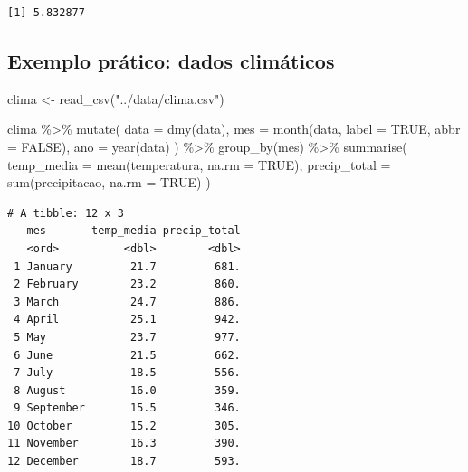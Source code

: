 \documentclass[
  letterpaper,
]{scrbook}
\newenvironment{Shaded}{\begin{snugshade}}{\end{snugshade}}
\newcommand{\AttributeTok}[1]{\textcolor[rgb]{0.40,0.45,0.13}{#1}}
\newcommand{\ConstantTok}[1]{\textcolor[rgb]{0.56,0.35,0.01}{#1}}
\newcommand{\FunctionTok}[1]{\textcolor[rgb]{0.28,0.35,0.67}{#1}}
\newcommand{\NormalTok}[1]{\textcolor[rgb]{0.00,0.23,0.31}{#1}}
\newcommand{\OtherTok}[1]{\textcolor[rgb]{0.00,0.23,0.31}{#1}}
\newcommand{\SpecialCharTok}[1]{\textcolor[rgb]{0.37,0.37,0.37}{#1}}
\newcommand{\StringTok}[1]{\textcolor[rgb]{0.13,0.47,0.30}{#1}}
\begin{document}
\begin{verbatim}
[1] 5.832877
\end{verbatim}

\subsection{Exemplo prático: dados
climáticos}\label{exemplo-pruxe1tico-dados-climuxe1ticos}

\begin{Shaded}
\begin{Highlighting}[]
\NormalTok{clima }\OtherTok{\textless{}{-}} \FunctionTok{read\_csv}\NormalTok{(}\StringTok{"../data/clima.csv"}\NormalTok{)}

\NormalTok{clima }\SpecialCharTok{\%\textgreater{}\%}
  \FunctionTok{mutate}\NormalTok{(}
    \AttributeTok{data =} \FunctionTok{dmy}\NormalTok{(data),}
    \AttributeTok{mes =} \FunctionTok{month}\NormalTok{(data, }\AttributeTok{label =} \ConstantTok{TRUE}\NormalTok{, }\AttributeTok{abbr =} \ConstantTok{FALSE}\NormalTok{),}
    \AttributeTok{ano =} \FunctionTok{year}\NormalTok{(data)}
\NormalTok{  ) }\SpecialCharTok{\%\textgreater{}\%}
  \FunctionTok{group\_by}\NormalTok{(mes) }\SpecialCharTok{\%\textgreater{}\%}
  \FunctionTok{summarise}\NormalTok{(}
    \AttributeTok{temp\_media =} \FunctionTok{mean}\NormalTok{(temperatura, }\AttributeTok{na.rm =} \ConstantTok{TRUE}\NormalTok{),}
    \AttributeTok{precip\_total =} \FunctionTok{sum}\NormalTok{(precipitacao, }\AttributeTok{na.rm =} \ConstantTok{TRUE}\NormalTok{)}
\NormalTok{  )}
\end{Highlighting}
\end{Shaded}

\begin{verbatim}
# A tibble: 12 x 3
   mes       temp_media precip_total
   <ord>          <dbl>        <dbl>
 1 January         21.7         681.
 2 February        23.2         860.
 3 March           24.7         886.
 4 April           25.1         942.
 5 May             23.7         977.
 6 June            21.5         662.
 7 July            18.5         556.
 8 August          16.0         359.
 9 September       15.5         346.
10 October         15.2         305.
11 November        16.3         390.
12 December        18.7         593.
\end{verbatim}
\end{document}
